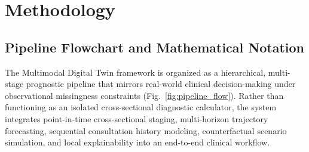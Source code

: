\documentclass[11pt,a4paper]{article}
\begin{document}



\section{Methodology}
\label{sec:methodology}

\subsection{Pipeline Flowchart and Mathematical Notation}
\label{sec:method_flowchart}
The Multimodal Digital Twin framework is organized as a hierarchical, multi-stage prognostic pipeline that mirrors real-world clinical decision-making under observational missingness constraints (Fig.~\ref{fig:pipeline_flow}). Rather than functioning as an isolated cross-sectional diagnostic calculator, the system integrates point-in-time cross-sectional staging, multi-horizon trajectory forecasting, sequential consultation history modeling, counterfactual scenario simulation, and local explainability into an end-to-end clinical workflow.
\end{document}
